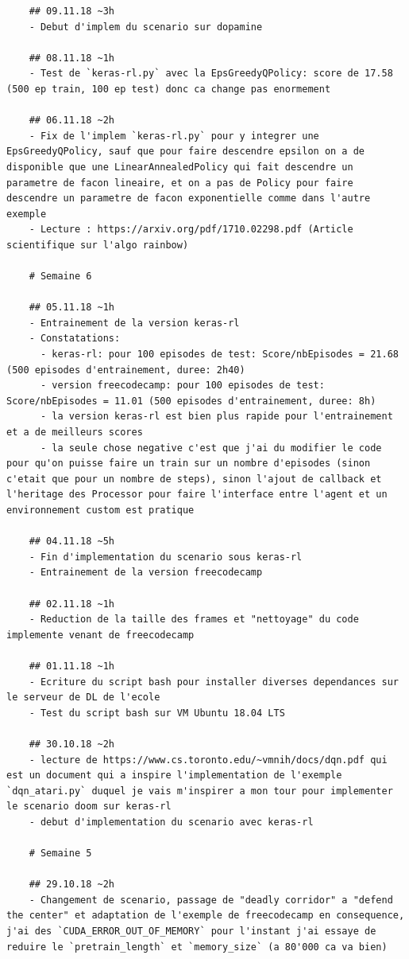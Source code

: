 \documentclass[a4paper,10pt,openany,oneside]{report}
\begin{document}
\begin{lstlisting}
	## 09.11.18 ~3h
	- Debut d'implem du scenario sur dopamine
	
	## 08.11.18 ~1h
	- Test de `keras-rl.py` avec la EpsGreedyQPolicy: score de 17.58 (500 ep train, 100 ep test) donc ca change pas enormement
	
	## 06.11.18 ~2h
	- Fix de l'implem `keras-rl.py` pour y integrer une EpsGreedyQPolicy, sauf que pour faire descendre epsilon on a de disponible que une LinearAnnealedPolicy qui fait descendre un parametre de facon lineaire, et on a pas de Policy pour faire descendre un parametre de facon exponentielle comme dans l'autre exemple
	- Lecture : https://arxiv.org/pdf/1710.02298.pdf (Article scientifique sur l'algo rainbow)
	
	# Semaine 6
	
	## 05.11.18 ~1h
	- Entrainement de la version keras-rl
	- Constatations:
	  - keras-rl: pour 100 episodes de test: Score/nbEpisodes = 21.68 (500 episodes d'entrainement, duree: 2h40)
	  - version freecodecamp: pour 100 episodes de test: Score/nbEpisodes = 11.01 (500 episodes d'entrainement, duree: 8h)
	  - la version keras-rl est bien plus rapide pour l'entrainement et a de meilleurs scores
	  - la seule chose negative c'est que j'ai du modifier le code pour qu'on puisse faire un train sur un nombre d'episodes (sinon c'etait que pour un nombre de steps), sinon l'ajout de callback et l'heritage des Processor pour faire l'interface entre l'agent et un environnement custom est pratique
	
	## 04.11.18 ~5h
	- Fin d'implementation du scenario sous keras-rl
	- Entrainement de la version freecodecamp
	
	## 02.11.18 ~1h
	- Reduction de la taille des frames et "nettoyage" du code implemente venant de freecodecamp
	
	## 01.11.18 ~1h
	- Ecriture du script bash pour installer diverses dependances sur le serveur de DL de l'ecole
	- Test du script bash sur VM Ubuntu 18.04 LTS
	
	## 30.10.18 ~2h
	- lecture de https://www.cs.toronto.edu/~vmnih/docs/dqn.pdf qui est un document qui a inspire l'implementation de l'exemple `dqn_atari.py` duquel je vais m'inspirer a mon tour pour implementer le scenario doom sur keras-rl
	- debut d'implementation du scenario avec keras-rl
	
	# Semaine 5
	
	## 29.10.18 ~2h
	- Changement de scenario, passage de "deadly corridor" a "defend the center" et adaptation de l'exemple de freecodecamp en consequence, j'ai des `CUDA_ERROR_OUT_OF_MEMORY` pour l'instant j'ai essaye de reduire le `pretrain_length` et `memory_size` (a 80'000 ca va bien)
	

\end{lstlisting}
\end{document}
